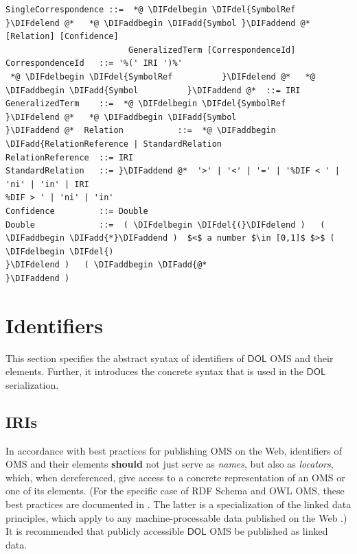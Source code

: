 \documentclass[10pt,fleqn,final]{scrreprt}
\makeatletter
\newcommand*\CommentAuthor{}
\renewcommand*\CommentAuthor{#1}}
\newcommand*\CommentDate{}
\renewcommand*\CommentDate{#1}}
\newcommand*\CommentId{}
\renewcommand*\CommentId{#1}}
\newcommand*\CommentType{}
\renewcommand*\CommentType{#1}}
\newcommand*{\SetCommentColorByType}[1]{%
\edef\localType{{#1}}%
\expandafter\ifstrequal\localType{q-aut}{\colorlet{CommentColor}{red}}{%
\expandafter\ifstrequal\localType{q-all}{\colorlet{CommentColor}{orange}}{%
\expandafter\ifstrequal\localType{todo}{\colorlet{CommentColor}{orange}}{%
\expandafter\ifstrequal\localType{fyi}{\colorlet{CommentColor}{lightgray}}{%
\colorlet{CommentColor}{yellow}}}}}}
\newcommand*{\SetCommentPrefixByType}[1]{%
\edef\localType{{#1}}%
\expandafter\@ifmtarg\localType{%
\edef\CommentPrefix{}%
}{%
\caseupper[q]{#1}%
\edef\CommentPrefix{\thestring: }%
}}
\newcommand*{\initComment}[1]{%
\setkeys{Comment}{#1}%
\SetCommentColorByType{\CommentType}%
\relax%
\SetCommentPrefixByType{\CommentType}%
\relax%
}
\newcommand*{\todonote}[2][]{%
\initComment{#1}%
\pdfcomment[author=\CommentAuthor,color=CommentColor,date=\CommentDate,id=\CommentId]{%
\CommentPrefix
#2}}
\renewcommand*{\todonote}[2][]{%
\initComment{#1}%
\ednote{\CommentPrefix #2}}
\newcommand*{\CLnote}[2][author=Christoph Lange]{%
\todonote[author=Christoph Lange,#1]{#2} 
}
\newcommand*{\should}{\textbf{should}\xspace}
\newcommand*{\DOL}{\ensuremath{\mathsf{DOL}}\xspace}
\newcommand{\sclause}[1]{\section{#1}}
\newcommand{\ssclause}[1]{\subsection{#1}}
\newenvironment{definitions}[0]{\medskip }{}
\providecommand{\DIFadd}[1]{{\protect\color{blue}\uwave{#1}}} %
\providecommand{\DIFdel}[1]{{\protect\color{red}\sout{#1}}}                      %
\providecommand{\DIFaddbegin}{} %
\providecommand{\DIFaddend}{} %
\providecommand{\DIFdelbegin}{} %
\providecommand{\DIFdelend}{} %
\makeatother
\begin{document}
\begin{definitions}
\begin{lstlisting}[language=ebnf,mathescape]
SingleCorrespondence ::=  *@ \DIFdelbegin \DIFdel{SymbolRef }\DIFdelend @*   *@ \DIFaddbegin \DIFadd{Symbol }\DIFaddend @*  [Relation] [Confidence]
                         GeneralizedTerm [CorrespondenceId]
CorrespondenceId   ::= '%(' IRI ')%'
 *@ \DIFdelbegin \DIFdel{SymbolRef          }\DIFdelend @*   *@ \DIFaddbegin \DIFadd{Symbol          }\DIFaddend @*  ::= IRI
GeneralizedTerm    ::=  *@ \DIFdelbegin \DIFdel{SymbolRef
}\DIFdelend @*   *@ \DIFaddbegin \DIFadd{Symbol
}\DIFaddend @*  Relation           ::=  *@ \DIFaddbegin \DIFadd{RelationReference | StandardRelation
RelationReference  ::= IRI
StandardRelation   ::= }\DIFaddend @*  '>' | '<' | '=' | '%DIF < ' | 'ni' | 'in' | IRI
%DIF > ' | 'ni' | 'in'
Confidence         ::= Double
Double             ::=  ( \DIFdelbegin \DIFdel{(}\DIFdelend )   ( \DIFaddbegin \DIFadd{*}\DIFaddend )  $<$ a number $\in [0,1]$ $>$ ( \DIFdelbegin \DIFdel{) 
}\DIFdelend )   ( \DIFaddbegin \DIFadd{@*
}\DIFaddend ) 
\end{lstlisting}






\sclause{Identifiers}\label{c:identifiers}
This section specifies the abstract syntax of identifiers of \DOL OMS and their elements. Further, 
it introduces the concrete syntax that is used in the \DOL serialization. 
\DIFdelbegin %

\DIFdelend \ssclause{IRIs}\label{c:iris}


In accordance with best practices for publishing OMS on the Web, identifiers of OMS and their 
elements \should not just serve as \emph{names}, but also as \emph{locators}, which, when 
dereferenced, give access to a concrete representation of an OMS or one of its elements.  (For the 
specific case of RDF Schema and OWL OMS, these best practices are documented in 
\cite{W3C:NOTE-swbp-vocab-pub-20080828}.  The latter is a specialization of the linked data 
principles, which apply to any machine-processable data published on the Web 
\cite{BernersLee:LinkedData2006}.)  It is recommended that publicly accessible \DOL OMS be published 
as linked data.


\end{definitions}
\end{document}
